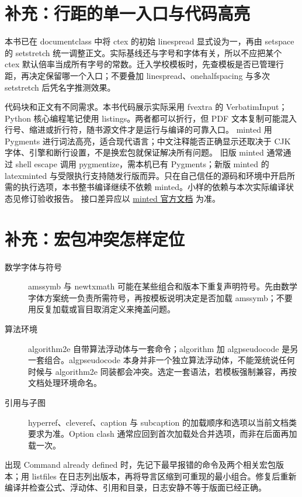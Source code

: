 \section{补充：行距的单一入口与代码高亮}\label{rev:latex:spacing}
本书已在 documentclass 中将 ctex 的初始 linespread 显式设为一，再由 setspace 的 setstretch 统一调整正文。实际基线还与字号和字体有关，所以不应把某个 ctex 默认倍率当成所有字号的常数。迁入学校模板时，先查模板是否已管理行距，再决定保留哪一个入口；不要叠加 linespread、onehalfspacing 与多次 setstretch 后凭名字推测效果。

代码块和正文有不同需求。本书代码展示实际采用 fvextra 的 VerbatimInput；Python 核心编程笔记使用 listings。两者都可以折行，但 PDF 文本复制可能混入行号、缩进或折行符，随书源文件才是运行与编译的可靠入口。
minted 用 Pygments 进行词法高亮，适合现代语言；中文注释能否正确显示还取决于 CJK 字体、引擎和断行设置，不是换宏包就保证解决所有问题。
旧版 minted 通常通过 shell escape 调用 pygmentize，需本机已有 Pygments；新版 minted 的 latexminted 与受限执行支持随发行版而异。只在自己信任的源码和环境中开启所需的执行选项，本书整书编译继续不依赖 minted。小样的依赖与本次实际编译状态见修订验收报告。
接口差异应以 \href{https://ctan.org/pkg/minted}{minted 官方文档} 为准。

\section{补充：宏包冲突怎样定位}\label{rev:latex:conflicts}
\begin{description}
\item[数学字体与符号] amssymb 与 newtxmath 可能在某些组合和版本下重复声明符号。先由数学字体方案统一负责所需符号，再按模板说明决定是否加载 amssymb；不要用反复加载或盲目取消定义来掩盖问题。
\item[算法环境] algorithm2e 自带算法浮动体与一套命令；algorithm 加 algpseudocode 是另一套组合。algpseudocode 本身并非一个独立算法浮动体，不能笼统说任何时候与 algorithm2e 同装都会冲突。选定一套语法，若模板强制兼容，再按文档处理环境命名。
\item[引用与子图] hyperref、cleveref、caption 与 subcaption 的加载顺序和选项以当前文档类要求为准。Option clash 通常应回到首次加载处合并选项，而非在后面再加载一次。
\end{description}
出现 Command already defined 时，先记下最早报错的命令及两个相关宏包版本；用 listfiles 在日志列出版本，再将导言区缩到可重现的最小组合。修复后重新编译并检查公式、浮动体、引用和目录，日志安静不等于版面已经正确。

